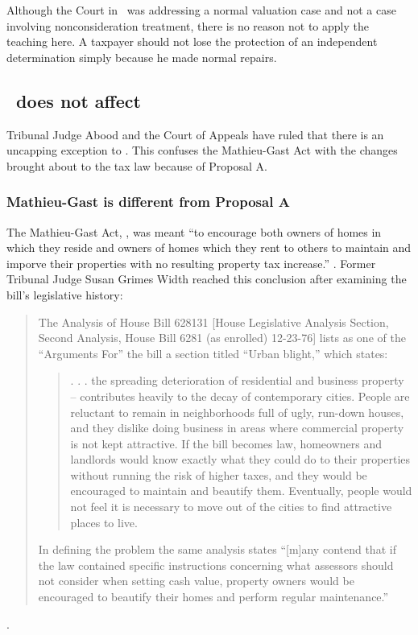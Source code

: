 \documentclass[12pt,\documentclassflag]{michiganCourtOfAppealsBrief}
\begin{document}
Although the Court in \cite[s]{Jones & Laughlin}\ was addressing a normal valuation case and not a case involving nonconsideration treatment, there is no reason not to apply the teaching here. A taxpayer should not lose the protection of an independent determination simply because he made normal repairs.

\subsection{\cite{MCL 211.27a(3)}\ does not affect \mathieuGast}

Tribunal Judge Abood and the Court of Appeals have ruled that there is an uncapping exception to \mathieuGast. This confuses the Mathieu-Gast Act with the changes brought about to the tax law because of Proposal A. 

\subsubsection{Mathieu-Gast is different from Proposal A}

The Mathieu-Gast Act, \mathieuGast, was meant ``to encourage both owners of homes in which they reside and owners of homes which they rent to others to maintain and imporve their properties with no resulting property tax increase.'' .
Former Tribunal Judge Susan Grimes Width reached this conclusion after examining the bill's legislative history:
  \begin{quotation}
    The Analysis of House Bill 628131 [House Legislative Analysis Section, Second Analysis, House Bill 6281 (as enrolled) 12-23-76] lists as one of the ``Arguments For'' the bill a section titled
``Urban blight,'' which states:
\begin{quote}
  . . . the spreading deterioration of residential and business property -- contributes
heavily to the decay of contemporary cities. People are reluctant to remain in
neighborhoods full of ugly, run-down houses, and they dislike doing business in
areas where commercial property is not kept attractive. If the bill becomes law,
homeowners and landlords would know exactly what they could do to their
properties without running the risk of higher taxes, and they would be encouraged
to maintain and beautify them. Eventually, people would not feel it is necessary to
move out of the cities to find attractive places to live.
\end{quote}

In defining the problem the same analysis states ``[m]any contend that if the law contained
specific instructions concerning what assessors should not consider when setting cash value,
property owners would be encouraged to beautify their homes and perform regular
maintenance.''
\end{quotation}
.
\end{document}
